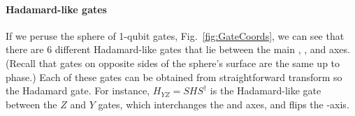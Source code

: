  



\paragraph{Hadamard-like gates}
If we peruse the sphere of 1-qubit gates, Fig.~\ref{fig:GateCoords}, we can see that there are 6 different Hadamard-like gates that lie between the main , , and  axes. (Recall that gates on opposite sides of the sphere's surface are the same up to phase.) Each of these gates can be obtained from straightforward transform so the Hadamard gate. For instance, $H_{YZ} = S H S^\dagger$ is the Hadamard-like gate between the $Z$ and $Y$ gates, which interchanges the  and  axes, and flips the -axis.


